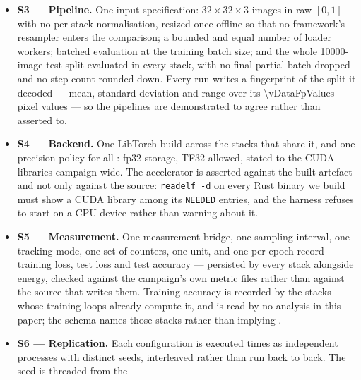 \begin{itemize}
        batch size, one epoch count, one loss and one seeding policy. The
        learning rate and the batch size are checked against the source of every
        file the campaign executes --- universally, rather than by finding one
        file that matches; the rest is asserted by the specification and was
        checked by reading.
  \item \textbf{S3 --- Pipeline.} One input specification: $32\times32\times3$
        images in raw $[0,1]$ with no per-stack normalisation, resized once
        offline so that no framework's resampler enters the comparison; a
        bounded and equal number of loader workers; batched evaluation at the
        training batch size; and the whole \num{10000}-image test split evaluated in
        every stack, with no final partial batch dropped and no step count
        rounded down. Every run writes a fingerprint of the split it decoded ---
        mean, standard deviation and range over its \num{\vDataFpValues} pixel
        values --- so the pipelines are demonstrated to agree rather than
        asserted to.
  \item \textbf{S4 --- Backend.} One LibTorch build across the \vCtrlStacks{}
        stacks that share it, and one precision policy for all \vEcosystems{}:
        fp32 storage, TF32 allowed, stated to the CUDA libraries campaign-wide.
        The accelerator is asserted against the built artefact and not only
        against the source: \texttt{readelf -d} on every Rust binary we build
        must show a CUDA library among its \texttt{NEEDED} entries, and the
        harness refuses to start on a CPU device rather than warning about it.
  \item \textbf{S5 --- Measurement.} One measurement bridge, one sampling
        interval, one tracking mode, one set of counters, one unit, and one
        per-epoch record --- training loss, test loss and test accuracy ---
        persisted by every stack alongside energy, checked against the
        campaign's own metric files rather than against the source that writes
        them. Training accuracy is recorded by the \vTrainAccStacks{} stacks
        whose training loops already compute it, and is read by no analysis in
        this paper; the schema names those stacks rather than implying
        \vEcosystems{}.
  \item \textbf{S6 --- Replication.} Each configuration is executed
        \vRepetitions{} times as independent processes with distinct seeds,
        interleaved rather than run back to back. The seed is threaded from the

\end{itemize}
